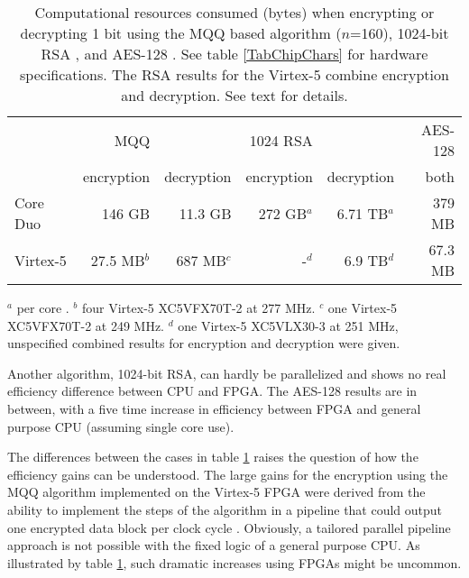\documentclass{article}
\begin{document}
\begin{comment}
Core Duo:
MQQ enc: 7.57*10^(17)/(5.19*10^6)
MQQ dec: 7.57*10^(17)/(67.0*10^6)
RSA enc: 7.57*10^(17)/(2*1.39*10^6)
RSA dec: 7.57*10^(17)/(2*56.4*10^3)
AES enc: 7.57*10^(17)/(2*1*10^9)
Virtex:
MQQ enc: 4*3.04*10^(17)/(44.27*10^9)
MQQ dec: 2.74*10^(17)/(399.04*10^6)
RSA enc: 2.76*10^(17)/(40*10^3)
RSA dec: 
AES enc: 2.76*10^(17)/(4.1*10^9)
\end{comment}

\begin{table}[b]
\caption{Computational resources consumed (bytes) when encrypting or decrypting 1 
bit using the MQQ based algorithm ($n$=160)\cite{Gligoroski0808.0247}, 1024-bit RSA
\cite{Gligoroski0808.0247}, and AES-128 \cite{JemMatzan2006,bulens2008implementation}. 
See table \ref{TabChipChars} for hardware specifications. The RSA results 
for the Virtex-5 combine encryption and decryption. See text for details.}
\begin{tabular}{lrrrrr}
                 & MQQ        &            &1024 RSA & &AES-128\\
                 & encryption & decryption &encryption & decryption & both\\
\hline
Core Duo & 146 GB& 11.3 GB & 272 GB$^a$ & 6.71 TB$^a$ & 379 MB\\
Virtex-5 & 27.5 MB$^b$  & 687 MB$^c$ & -$^d$ & 6.9 TB$^d$ & 67.3 MB\\
\end{tabular} \newline
{\footnotesize $^a$ per core \cite{PersonalGligoroski}. $^b$ four Virtex-5 XC5VFX70T-2 at 277 MHz.
$^c$ one Virtex-5 XC5VFX70T-2 at 249 MHz. $^d$ one Virtex-5 XC5VLX30-3 at 251 MHz, unspecified combined 
results for encryption and decryption were given.}
\label{TabCompRes}
\end{table}

Another algorithm, 1024-bit RSA, can hardly be parallelized and shows no real efficiency difference 
between CPU and FPGA. The AES-128 results are in between,
with a five time increase in efficiency between FPGA and general purpose CPU (assuming single core use).

The differences between the cases in table \ref{TabCompRes} raises the question of how the efficiency
gains can be understood. The large gains for the encryption using the MQQ algorithm implemented on
the Virtex-5 FPGA were derived from the ability to implement the steps of the algorithm in a pipeline that
could output one encrypted data block per clock cycle \cite{PersonalGligoroski}. Obviously, a 
tailored parallel pipeline approach is not possible with the fixed logic of a general purpose CPU. 
As illustrated by table \ref{TabCompRes}, such dramatic increases using FPGAs might be uncommon.
\end{document}

